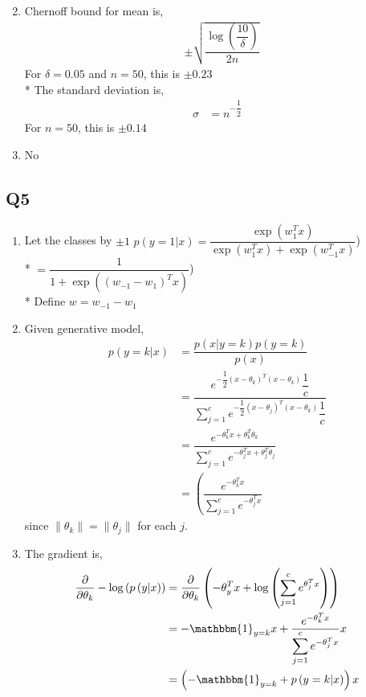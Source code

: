 \documentclass{article}
\begin{document}
\begin{enumerate}
\setcounter{enumii}{1}
\item Chernoff bound for mean is,
\begin{align*}
&\pm \sqrt{\dfrac{\log\left(\dfrac{10}{\delta}\right)}{2 n}}
\end{align*}
For $\delta = 0.05$ and $n  = 50$, this is $\pm 0.23$
\\* The standard deviation is,
\begin{align*}
\sigma &= n^{- \dfrac{1}{2}}
\end{align*}
For $n  = 50$, this is $\pm 0.14$

\item No
\end{enumerate}



\subsection{Q5}
\begin{enumerate}
\item Let the classes by $\pm 1$
$p\left(y = 1 | x\right)  = \dfrac{\exp\left(w_{1}^{T} x\right)}{\exp\left(w_{1}^{T} x\right) + \exp\left(w_{-1}^{T} x\right)}$)
\\* $= \dfrac{1}{1 + \exp\left(\left(w_{-1} - w_{1}\right)^{T} x\right)}$)
\\* Define $w  = w_{-1} - w_{1}$

\item Given generative model,
\begin{align*}
p\left(y = k | x\right)  &= \dfrac{p\left(x | y = k\right) p\left(y = k\right)}{p\left(x\right)}
\\ &= \dfrac{e^{- \dfrac{1}{2} \left(x - \theta_{k}\right)^{T} \left(x - \theta_{k}\right)} \dfrac{1}{c}}{\displaystyle\sum_{j=1}^{c} e^{- \dfrac{1}{2} \left(x - \theta_{j}\right)^{T} \left(x - \theta_{k}\right)} \dfrac{1}{c}}
\\ &= \dfrac{e^{- \theta_{k}^{T} x + \theta_{k}^{T} \theta_{k}}}{\displaystyle\sum_{j=1}^{c} e^{- \theta_{j}^{T} x + \theta_{j}^{T} \theta_{j}}}
\\ &= \left(\dfrac{e^{- \theta_{k}^{T} x}}{\displaystyle\sum_{j=1}^{c} e^{- \theta_{j}^{T} x}}\right.
\end{align*}
since $\| \theta_{k} \| = \| \theta_{j} \|$ for each $j. $

\item The gradient is,
\begin{align*}
\dfrac{\partial }{\partial \theta_{k}} - \log\left(p\left(y|x\right)\right) &= \dfrac{\partial }{\partial \theta_{k}} \left(- \theta_{y}^{T} x + \log\left(\displaystyle\sum_{j=1}^{c} e^{\theta_{j}^{T} x}\right)\right)
\\ &= - \mathbbm{1}_{y = k} x + \dfrac{e^{- \theta_{k}^{T} x}}{\displaystyle\sum_{j=1}^{c} e^{- \theta_{j}^{T} x}} x 
\\ &= \left(- \mathbbm{1}_{y = k} + p\left(y = k | x\right)\right) x 
\end{align*}
\end{enumerate}
\end{document}
